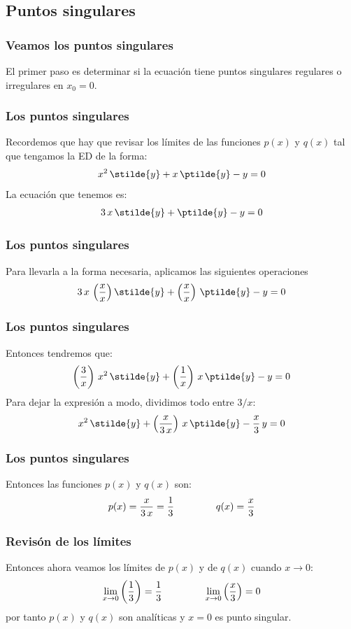\subsection{Puntos singulares}
\begin{frame}
\frametitle{Veamos los puntos singulares}
El primer paso es determinar si la ecuación tiene puntos singulares regulares o irregulares en $x_{0}=0$.
\end{frame}
\begin{frame}
\frametitle{Los puntos singulares}
Recordemos que hay que revisar los límites de las funciones $p(x)$ y $q(x)$ tal que tengamos la ED de la forma:
\begin{align*}
x^{2} \, \stilde{y} + x \, \ptilde{y} - y = 0
\end{align*}
\pause
La ecuación que tenemos es:
\begin{align*}
3 \, x \, \stilde{y} + \ptilde{y} - y = 0
\end{align*}
\end{frame}
\begin{frame}
\frametitle{Los puntos singulares}
Para llevarla a la forma necesaria, aplicamos las siguientes operaciones
\begin{align*}
3 \, x \, \left( \dfrac{x}{x} \right) \stilde{y} + \left( \dfrac{x}{x} \right) \, \ptilde{y} - y = 0
\end{align*}
\end{frame}
\begin{frame}
\frametitle{Los puntos singulares}
Entonces tendremos que:
\begin{align*}
\left( \dfrac{3}{x} \right) \, x^{2} \,  \stilde{y} + \left( \dfrac{1}{x} \right) \, x \, \ptilde{y} - y = 0
\end{align*}
\pause
Para dejar la expresión a modo, dividimos todo entre $3/x$:
\begin{align*}
x^{2} \,  \stilde{y} + \left( \dfrac{x}{3 \, x} \right) \, x \, \ptilde{y} - \dfrac{x}{3} \, y = 0
\end{align*}
\end{frame}
\begin{frame}
\frametitle{Los puntos singulares}
Entonces las funciones $p(x)$ y $q(x)$ son:
\begin{align*}
p(x) =  \dfrac{x}{3 \, x} = \dfrac{1}{3} \hspace{1.5cm} q(x) = \dfrac{x}{3}
\end{align*}
\end{frame}
\begin{frame}
\frametitle{Revisón de los límites}
Entonces ahora veamos los límites de $p(x)$ y de $q(x)$ cuando $ x \to 0$:
\begin{align*}
\lim_{x \to 0} \left( \dfrac{1}{3} \right) = \dfrac{1}{3} \hspace{1.5cm} \lim_{x \to 0} \left( \dfrac{x}{3} \right) =  0
\end{align*}
por tanto $p(x)$ y $q(x)$ son analíticas y $x = 0$ es punto singular.
\end{frame}
